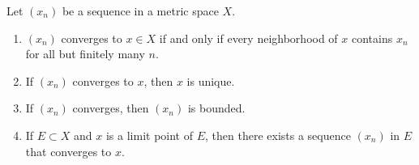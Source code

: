   \begin{theorem}
    Let $(x_n)$ be a sequence in a metric space $X$. 
    \begin{enumerate}
      \item $(x_n)$ converges to $x \in X$ if and only if every neighborhood of $x$ contains $x_n$ for all but finitely many $n$. 
      \item If $(x_n)$ converges to $x$, then $x$ is unique. 
      \item If $(x_n)$ converges, then $(x_n)$ is bounded. 
      \item If $E \subset X$ and $x$ is a limit point of $E$, then there exists a sequence $(x_n)$ in $E$ that converges to $x$. 
    \end{enumerate}
  \end{theorem}
